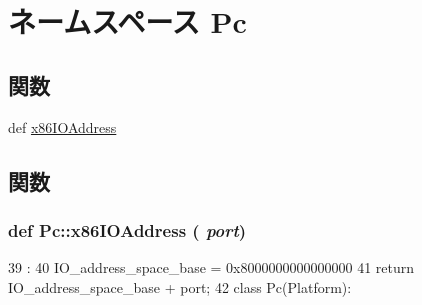 \hypertarget{namespacePc}{
\section{ネームスペース Pc}
\label{namespacePc}
}
\subsection*{関数}
\begin{DoxyCompactItemize}
\item 
def \hyperlink{namespacePc_afacdd6697043ac99418a24ccd5741847}{x86IOAddress}
\end{DoxyCompactItemize}


\subsection{関数}
\hypertarget{namespacePc_afacdd6697043ac99418a24ccd5741847}{
\subsubsection[{x86IOAddress}]{\setlength{\rightskip}{0pt plus 5cm}def Pc::x86IOAddress ( {\em port})}}
\label{namespacePc_afacdd6697043ac99418a24ccd5741847}



\begin{DoxyCode}
39                       :
40     IO_address_space_base = 0x8000000000000000
41     return IO_address_space_base + port;
42 
class Pc(Platform):
\end{DoxyCode}
